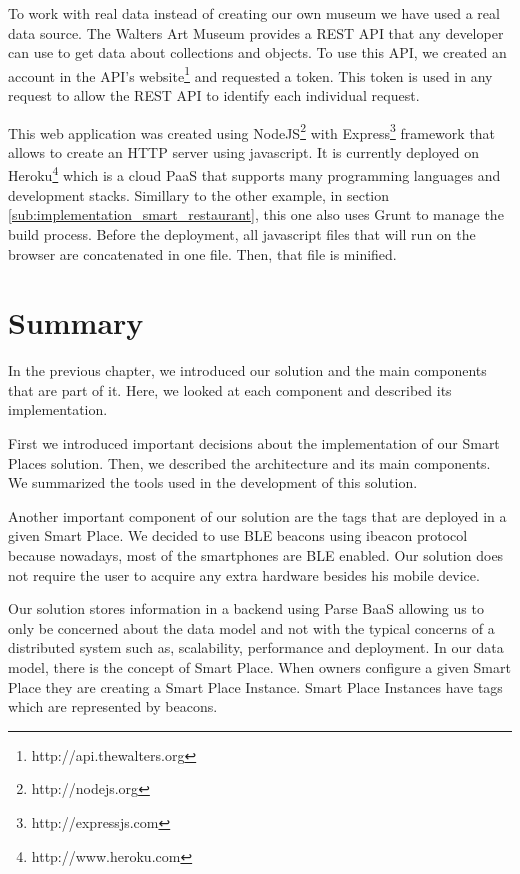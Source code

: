 To work with real data instead of creating our own museum we have used a real data source.
The Walters Art Museum provides a \gls{REST} \gls{API} that any developer can use to get data about collections and objects.
To use this \gls{API}, we created an account in the \gls{API}'s website\footnote{http://api.thewalters.org} and requested a token. This token is used in any request to allow the \gls{REST} \gls{API} to identify each individual request.

This web application was created using NodeJS\footnote{http://nodejs.org} with Express\footnote{http://expressjs.com} framework that allows to create an \gls{HTTP} server using javascript.
It is currently deployed on Heroku\footnote{http://www.heroku.com} which is a cloud \gls{PaaS} that supports many programming languages and development stacks.
Simillary to the other example, in section \ref{sub:implementation_smart_restaurant}, this one also uses Grunt to manage the build process. Before the deployment, all javascript files that will run on the browser are concatenated in one file.
Then, that file is minified.

\section{Summary}
\label{sec:implementation_summary}
In the previous chapter, we introduced our solution and the main components that are part of it.
Here, we looked at each component and described its implementation.

First we introduced important decisions about the implementation of our Smart Places solution.
Then, we described the architecture and its main components.
We summarized the tools used in the development of this solution.

Another important component of our solution are the tags that are deployed in a given Smart Place.
We decided to use \gls{BLE} beacons using ibeacon protocol because nowadays, most of the smartphones are \gls{BLE} enabled.
Our solution does not require the user to acquire any extra hardware besides his mobile device.

Our solution stores information in a backend using Parse \gls{BaaS} allowing us to only be concerned about the data model and not with the typical concerns of a distributed system such as, scalability, performance and deployment.
In our data model, there is the concept of Smart Place. When owners configure a given Smart Place they are creating a Smart Place Instance.
Smart Place Instances have tags which are represented by beacons.

